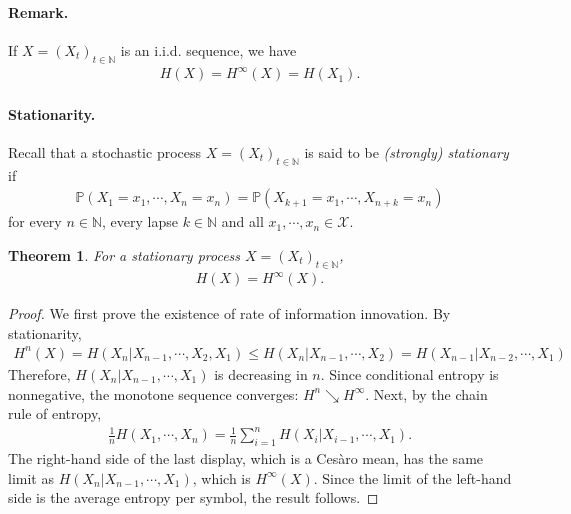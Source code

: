 \documentclass{article}
\numberwithin{equation}{section}
\newcommand{\bbN}{\mathbb{N}}
\newcommand{\bbP}{\mathbb{P}}
\renewcommand{\cal}{\mathcal}
\theoremstyle{plain}
\newtheorem{theorem}{Theorem}[section]
\theoremstyle{definition}
\begin{document}
\paragraph{Remark.} If $X=(X_t)_{t\in\bbN}$ is an i.i.d. sequence, we have
\begin{align*}
	H(X)=H^\infty(X)=H(X_1).
\end{align*}

\paragraph{Stationarity.} Recall that a stochastic process $X=(X_t)_{t\in\bbN}$ is said to be \textit{(strongly) stationary} if
\begin{align*}
	\bbP\left(X_1=x_1,\cdots,X_n=x_n\right)=\bbP\left(X_{k+1}=x_1,\cdots,X_{n+k}=x_n\right)
\end{align*}
for every $n\in\bbN$, every lapse $k\in\bbN$ and all $x_1,\cdots,x_n\in\cal{X}$. 

\begin{theorem}
For a stationary process $X=(X_t)_{t\in\bbN}$,
\begin{align*}
	H(X)=H^\infty(X).
\end{align*}
\end{theorem}
\begin{proof}
We first prove the existence of rate of information innovation. By stationarity,
\begin{align*}
	H^n(X)=H(X_n|X_{n-1},\cdots,X_2,X_1)\leq H(X_n|X_{n-1},\cdots,X_2) = H(X_{n-1}|X_{n-2},\cdots,X_1)
\end{align*}
Therefore, $H(X_n|X_{n-1},\cdots,X_1)$ is decreasing in $n$. Since conditional entropy is nonnegative, the monotone sequence converges: $H^n\searrow H^\infty$. Next, by the chain rule of entropy,
\begin{align*}
	\frac{1}{n}H(X_1,\cdots,X_n)=\frac{1}{n}\sum_{i=1}^n H(X_i|X_{i-1},\cdots,X_1).
\end{align*}
The right-hand side of the last display, which is a Cesàro mean, has the same limit as $H(X_n|X_{n-1},\cdots,X_1)$, which is $H^\infty(X)$. Since the limit of the left-hand side is the average entropy per symbol, the result follows.
\end{proof}
\end{document}
